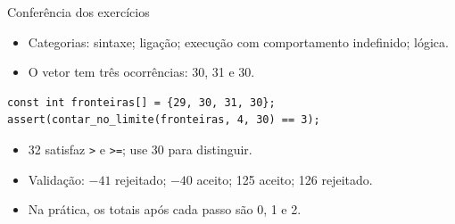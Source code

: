 \begin{frame}[fragile]{Conferência dos exercícios}
\begin{itemize}
\item Categorias: sintaxe; ligação; execução com comportamento indefinido; lógica.
\item O vetor tem três ocorrências: 30, 31 e 30.
\end{itemize}
\begin{lstlisting}
const int fronteiras[] = {29, 30, 31, 30};
assert(contar_no_limite(fronteiras, 4, 30) == 3);
\end{lstlisting}
\begin{itemize}
\item 32 satisfaz \texttt{>} e \texttt{>=}; use 30 para distinguir.
\item Validação: $-41$ rejeitado; $-40$ aceito; 125 aceito; 126 rejeitado.
\item Na prática, os totais após cada passo são 0, 1 e 2.
\end{itemize}
\end{frame}

